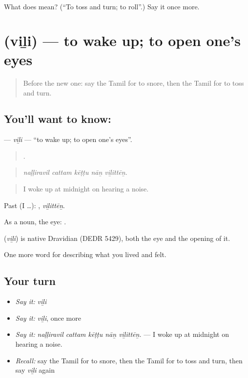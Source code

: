 \begin{tcolorbox}[breakable,colback=teal!4,colframe=teal!35!black,title={Before you move on}]
What does  mean? (\textquotedblleft{}To toss and turn; to roll\textquotedblright{}.) Say it once more.
\end{tcolorbox}
\section[\texorpdfstring{\ta{விழி} (viḻi)}{விழி (viḻi)}]{ (viḻi) — to wake up; to open one’s eyes}

\label{lesson:TA-C489-vili}



\begin{quote}
Before the new one: say the Tamil for to snore, then the Tamil for to toss and turn.
\end{quote}

\subsection*{You'll want to know: }
\textbf{} — \emph{viḻi} — \textquotedblleft{}to wake up; to open one’s eyes\textquotedblright{}.

\begin{quote}
    .
\end{quote}

\begin{quote}
\emph{naḷḷiravil cattam kēṭṭu nāṉ viḻittēṉ.}
\end{quote}

\begin{quote}
I woke up at midnight on hearing a noise.
\end{quote}

Past (I …): , \emph{viḻittēṉ}.

As a noun, the eye: .

\begin{cousinweb}
\textbf{} (\emph{viḻi}) is native Dravidian (DEDR 5429), both the eye and the opening of it.
\end{cousinweb}

\begin{grammarlens}[title={What you've built}]
One more word for describing what you lived and felt.
\end{grammarlens}

\subsection*{Your turn}
\begin{itemize}
\raggedright
  \item \emph{Say it:} \emph{viḻi}
  \item \emph{Say it:} \emph{viḻi}, once more
  \item \emph{Say it:} \emph{naḷḷiravil cattam kēṭṭu nāṉ viḻittēṉ.} — I woke up at midnight on hearing a noise.
  \item \emph{Recall:} say the Tamil for to snore, then the Tamil for to toss and turn, then say \emph{viḻi} again
\end{itemize}

